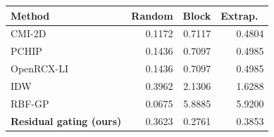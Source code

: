\small
\begin{tabular}{lrrr}\toprule
Method & Random & Block & Extrap.\ \\\midrule
CMI-2D & 0.1172 & 0.7117 & 0.4804 \\
PCHIP & 0.1436 & 0.7097 & 0.4985 \\
OpenRCX-LI & 0.1436 & 0.7097 & 0.4985 \\
IDW & 0.3962 & 2.1306 & 1.6288 \\
RBF-GP & 0.0675 & 5.8885 & 5.9200 \\
\textbf{Residual gating (ours)} & 0.3623 & 0.2761 & 0.3853 \\
\bottomrule\end{tabular}
